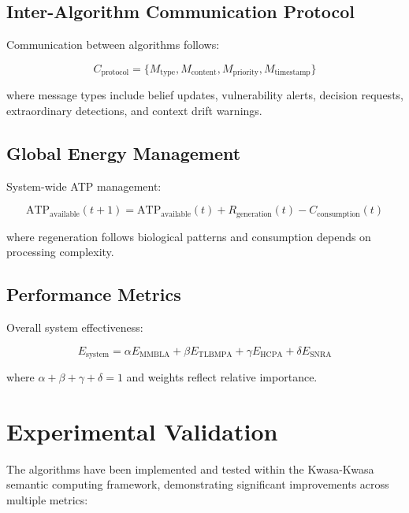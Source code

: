 \documentclass[12pt,a4paper]{article}
\begin{document}
\subsection{Inter-Algorithm Communication Protocol}

Communication between algorithms follows:

\begin{equation}
C_{\text{protocol}} = \{M_{\text{type}}, M_{\text{content}}, M_{\text{priority}}, M_{\text{timestamp}}\}
\end{equation}

where message types include belief updates, vulnerability alerts, decision requests, extraordinary detections, and context drift warnings.

\subsection{Global Energy Management}

System-wide ATP management:

\begin{equation}
\text{ATP}_{\text{available}}(t+1) = \text{ATP}_{\text{available}}(t) + R_{\text{generation}}(t) - C_{\text{consumption}}(t)
\end{equation}

where regeneration follows biological patterns and consumption depends on processing complexity.

\subsection{Performance Metrics}

Overall system effectiveness:

\begin{equation}
E_{\text{system}} = \alpha E_{\text{MMBLA}} + \beta E_{\text{TLBMPA}} + \gamma E_{\text{HCPA}} + \delta E_{\text{SNRA}}
\end{equation}

where $\alpha + \beta + \gamma + \delta = 1$ and weights reflect relative importance.

\section{Experimental Validation}

The algorithms have been implemented and tested within the Kwasa-Kwasa semantic computing framework, demonstrating significant improvements across multiple metrics:
\end{document}
